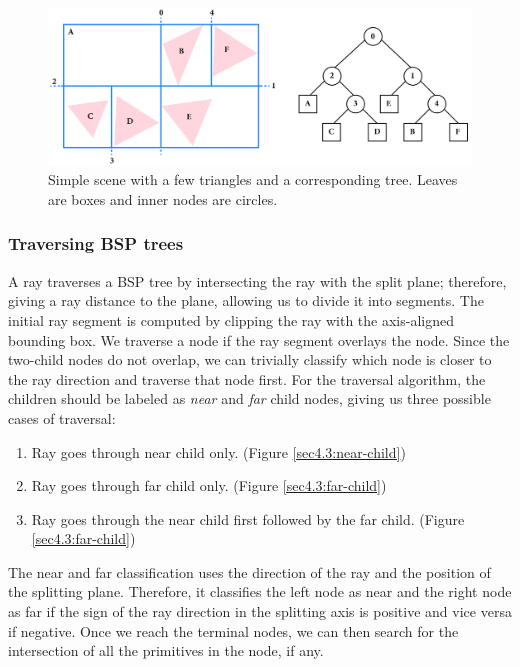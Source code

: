 \documentclass[a4paper,11pt,oneside]{article}
\begin{document}
\begin{figure}[H]
	\begin{center}
		\includegraphics[width=\textwidth]{section4/4.3/bsp-tree-example.png}
	\end{center}
	\caption{Simple scene with a few triangles and a corresponding tree. Leaves are boxes and inner nodes are circles.}
	\label{sec4.3:example-kd-tree}
\end{figure}

\subsubsection{Traversing BSP trees}

A ray traverses a BSP tree by intersecting the ray with the split plane; therefore, giving a ray distance to the plane, allowing us to divide it into segments. The initial ray segment is computed by clipping the ray with the axis-aligned bounding box. We traverse a node if the ray segment overlays the node. Since the two-child nodes do not overlap, we can trivially classify which node is closer to the ray direction and traverse that node first. For the traversal algorithm, the children should be labeled as \textit{near} and \textit{far} child nodes, giving us three possible cases of traversal:

\begin{enumerate}
	\item Ray goes through near child only. (Figure \ref{sec4.3:near-child})
	\item Ray goes through far child only. (Figure \ref{sec4.3:far-child})
	\item Ray goes through the near child first followed by the far child. (Figure \ref{sec4.3:far-child})
\end{enumerate}

The near and far classification uses the direction of the ray and the position of the splitting plane. Therefore, it classifies the left node as near and the right node as far if the sign of the ray direction in the splitting axis is positive and vice versa if negative. Once we reach the terminal nodes, we can then search for the intersection of all the primitives in the node, if any.
\end{document}
